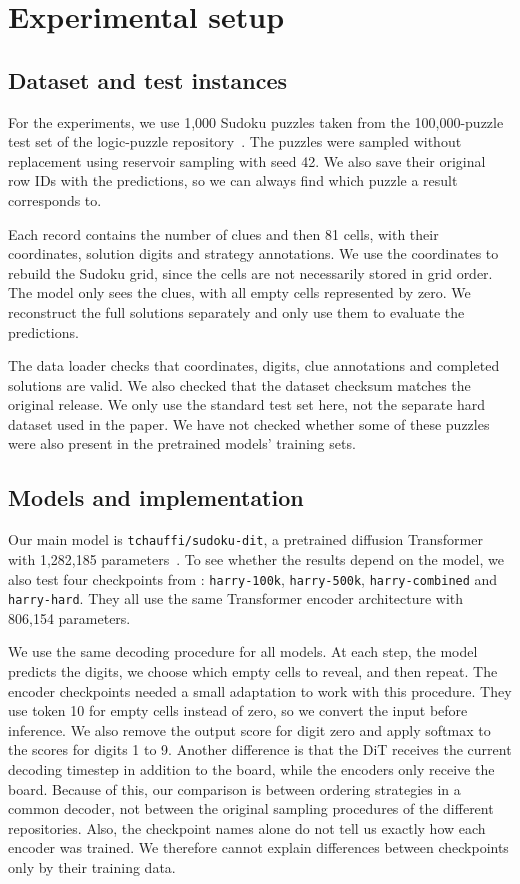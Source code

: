 \documentclass{article}
\begin{document}
\section{Experimental setup}
\label{sec:setup}

\subsection{Dataset and test instances}
For the experiments, we use 1,000 Sudoku puzzles taken from the 100,000-puzzle
 test set of the logic-puzzle repository~\citep{logicPuzzleData}. The puzzles
were sampled without replacement using reservoir sampling with seed 42. We
also save their original row IDs with the predictions, so we can always find
which puzzle a result corresponds to.

Each record contains the number of clues and then 81 cells, with their
coordinates, solution digits and strategy annotations. We use the coordinates
to rebuild the Sudoku grid, since the cells are not necessarily stored in grid
order. The model only sees the clues, with all empty cells represented by zero.
We reconstruct the full solutions separately and only use them to evaluate
the predictions.

The data loader checks that coordinates, digits, clue annotations and completed
solutions are valid. We also checked that the dataset checksum matches the
original release. We only use the standard test set here, not the separate
hard dataset used in the paper. We have not checked whether some of these
puzzles were also present in the pretrained models' training sets.

\subsection{Models and implementation}
Our main model is \texttt{tchauffi/sudoku-dit}, a pretrained diffusion
Transformer with 1,282,185 parameters~\citep{sudokuDiT}. To see whether the results depend on the model, we also test four checkpoints from \citet{sudokuEncoder}: \texttt{harry-100k},
\texttt{harry-500k}, \texttt{harry-combined} and \texttt{harry-hard}. They all
use the same Transformer encoder architecture with 806,154 parameters. 


We use the same decoding procedure for all models. At each step, the model
predicts the digits, we choose which empty cells to reveal, and then repeat.
The encoder checkpoints needed a small adaptation to work with this procedure.
They use token 10 for empty cells instead of zero, so we convert the input
before inference. We also remove the output score for digit zero and apply
softmax to the scores for digits 1 to 9. Another difference is that the DiT
receives the current decoding timestep in addition to the board, while the
encoders only receive the board. Because of this, our comparison is between
ordering strategies in a common decoder, not between the original sampling
procedures of the different repositories. Also, the checkpoint names alone
do not tell us exactly how each encoder was trained. We therefore cannot
explain differences between checkpoints only by their training data.
\end{document}
